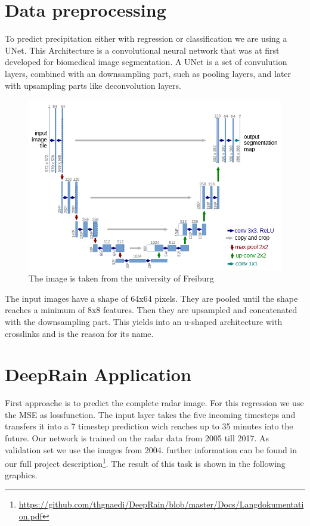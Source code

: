 \documentclass[oneside]{htwg-report}
\begin{document}
\section*{Data preprocessing}
To predict precipitation either with regression or classification we are using a UNet.
This Architecture is a convolutional neural network that was at first developed for biomedical image segmentation.
A UNet is a set of convulution layers, combined with an downsampling part, such as pooling layers, and later with upsampling parts like deconvolution layers.

\begin{figure}[ht]
\centering
\includegraphics[width=0.8\linewidth]{../pics/UNet_Biomedical}
\caption{The image is taken from the university of Freiburg~\cite{ronneberger2015u}}
\end{figure}

\begin{sloppypar}
\noindent The input images have a shape of 64x64 pixels. They are pooled until the shape reaches a minimum of 8x8 features. Then they are upsampled and concatenated with the downsampling part.
This yields into an u-shaped architecture with crosslinks and is the reason for its name.
\end{sloppypar}

\section*{DeepRain Application}
First approache is to predict the complete radar image. For this regression we use the MSE as lossfunction. The input layer takes the five incoming timesteps and transfers it into a 7 timestep prediction wich reaches up to 35 minutes into the future.
Our network is trained on the radar data from 2005 till 2017. As validation set we use the images from 2004. further information can be found in our full project description\footnote{\url{https://github.com/thgnaedi/DeepRain/blob/master/Docs/Langdokumentation.pdf}}.
The result of this task is shown in the following graphics.
\end{document}
